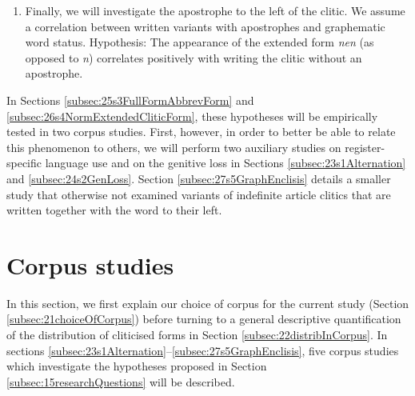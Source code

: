 \begin{enumerate}
	This is because \textit{nen} fulfills the minimal requirements to be a graphematic word: it is a well-formed graphematic syllable with a vowel grapheme (cf. \citealt[197]{Fuhrhop2008}).\footnote{
		For further discussion of the graphematic syllable, see \citet{FuhrhopBuchmann2009}.}
	Thus, we expect that the tendency to fill out the short form \textit{n} to \textit{nen} is purely formally conditioned, rather than functionally (which it would be if it had a preference for particular number or case).
	Hypothesis: Independent from the expected frequent appearance of the form \textit{nen} in the accusative masculine (given the full form \textit{einen}), the appearance of \textit{nen} in nominative masculine and nominative and accusative neuter is in principle equal.
	\item Finally, we will investigate the apostrophe to the left of the clitic.
	We assume a correlation between written variants with apostrophes and graphematic word status.
	Hypothesis: The appearance of the extended form \textit{nen} (as opposed to \textit{n}) correlates positively with writing the clitic without an apostrophe.
\end{enumerate}

In Sections \ref{subsec:25s3FullFormAbbrevForm} and \ref{subsec:26s4NormExtendedCliticForm}, these hypotheses will be empirically tested in two corpus studies.
First, however, in order to better be able to relate this phenomenon to others, we will perform two auxiliary studies on register-specific language use and on the genitive loss in Sections \ref{subsec:23s1Alternation} and \ref{subsec:24s2GenLoss}.
Section \ref{subsec:27s5GraphEnclisis} details a smaller study that otherwise not examined variants of indefinite article clitics that are written together with the word to their left.

\section{Corpus studies}
\label{sec:2corpusStudies}

In this section, we first explain our choice of corpus for the current study (Section \ref{subsec:21choiceOfCorpus}) before turning to a general descriptive quantification of the distribution of cliticised forms in Section \ref{subsec:22distribInCorpus}.
In sections \ref{subsec:23s1Alternation}--\ref{subsec:27s5GraphEnclisis}, five corpus studies which investigate the hypotheses proposed in Section \ref{subsec:15researchQuestions} will be described.

